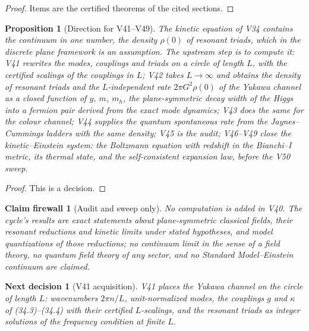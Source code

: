 \documentclass[11pt]{article}
\newtheorem{proposition}[theorem]{Proposition}
\newtheorem{firewall}[theorem]{Claim firewall}
\newtheorem{decision}[theorem]{Next decision}
\theoremstyle{remark}
\begin{document}
\begin{proof}
Items are the certified theorems of the cited sections.
\end{proof}

\begin{proposition}[Direction for V41--V49]
\label{prop:v20v40-direction}
The kinetic equation of V34 contains the continuum in one number,
the density \(\rho(0)\) of resonant triads, which in the discrete
plane framework is an assumption.  The upstream step is to compute
it: V41 rewrites the modes, couplings and triads on a circle of
length \(L\), with the certified scalings of the couplings in \(L\);
V42 takes \(L\to\infty\) and obtains the density of resonant triads
and the \(L\)-independent rate \(2\pi G^2\rho(0)\) of the Yukawa
channel as a closed function of \(y\), \(m\), \(m_h\), the
plane-symmetric decay width of the Higgs into a fermion pair derived
from the exact mode dynamics; V43 does the same for the colour
channel; V44 supplies the quantum spontaneous rate from the
Jaynes--Cummings ladders with the same density; V45 is the audit;
V46--V49 close the kinetic--Einstein system: the Boltzmann equation
with redshift in the Bianchi--I metric, its thermal state, and the
self-consistent expansion law, before the V50 sweep.
\end{proposition}

\begin{proof}
This is a decision.
\end{proof}

\begin{firewall}[Audit and sweep only]
\label{fire:v20v40}
No computation is added in V40.  The cycle's results are exact
statements about plane-symmetric classical fields, their resonant
reductions and kinetic limits under stated hypotheses, and model
quantizations of those reductions; no continuum limit in the sense
of a field theory, no quantum field theory of any sector, and no
Standard Model--Einstein continuum are claimed.
\end{firewall}

\begin{decision}[V41 acquisition]
\label{dec:v20v40-next}
V41 places the Yukawa channel on the circle of length \(L\):
wavenumbers \(2\pi n/L\), unit-normalized modes, the couplings
\(g\) and \(\kappa\) of (34.3)--(34.4) with their certified
\(L\)-scalings, and the resonant triads as integer solutions of the
frequency condition at finite \(L\).
\end{decision}
\end{document}
